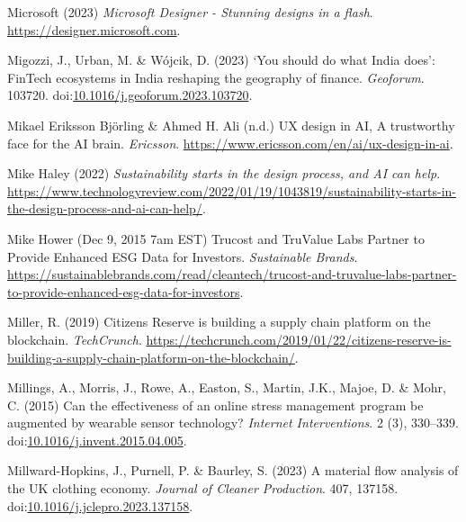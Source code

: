 \documentclass[
  letterpaper,
  DIV=11,
  numbers=noendperiod]{scrartcl}
\newlength{\cslhangindent}
\newenvironment{CSLReferences}[2] %
 {\begin{list}{}{%
  \setlength{\itemindent}{0pt}
  \setlength{\leftmargin}{0pt}
  \setlength{\parsep}{0pt}
  \ifodd #1
   \setlength{\leftmargin}{\cslhangindent}
   \setlength{\itemindent}{-1\cslhangindent}
  \fi
  \setlength{\itemsep}{#2\baselineskip}}}
 {\end{list}}
\begin{document}
\begin{CSLReferences}{0}{1}
Microsoft (2023) \emph{Microsoft {Designer} - {Stunning} designs in a
flash}. \url{https://designer.microsoft.com}.

Migozzi, J., Urban, M. \& Wójcik, D. (2023) {`{You} should do what
{India} does'}: {FinTech} ecosystems in {India} reshaping the geography
of finance. \emph{Geoforum}. 103720.
doi:\href{https://doi.org/10.1016/j.geoforum.2023.103720}{10.1016/j.geoforum.2023.103720}.

Mikael Eriksson Björling \& Ahmed H. Ali (n.d.) {UX} design in {AI}, {A}
trustworthy face for the {AI} brain. \emph{Ericsson}.
\url{https://www.ericsson.com/en/ai/ux-design-in-ai}.

Mike Haley (2022) \emph{Sustainability starts in the design process, and
{AI} can help}.
\url{https://www.technologyreview.com/2022/01/19/1043819/sustainability-starts-in-the-design-process-and-ai-can-help/}.

Mike Hower (Dec 9, 2015 7am EST) Trucost and {TruValue Labs Partner} to
{Provide Enhanced ESG Data} for {Investors}. \emph{Sustainable Brands}.
\url{https://sustainablebrands.com/read/cleantech/trucost-and-truvalue-labs-partner-to-provide-enhanced-esg-data-for-investors}.

Miller, R. (2019) Citizens {Reserve} is building a supply chain platform
on the blockchain. \emph{TechCrunch}.
\url{https://techcrunch.com/2019/01/22/citizens-reserve-is-building-a-supply-chain-platform-on-the-blockchain/}.

Millings, A., Morris, J., Rowe, A., Easton, S., Martin, J.K., Majoe, D.
\& Mohr, C. (2015) Can the effectiveness of an online stress management
program be augmented by wearable sensor technology? \emph{Internet
Interventions}. 2 (3), 330--339.
doi:\href{https://doi.org/10.1016/j.invent.2015.04.005}{10.1016/j.invent.2015.04.005}.

Millward-Hopkins, J., Purnell, P. \& Baurley, S. (2023) A material flow
analysis of the {UK} clothing economy. \emph{Journal of Cleaner
Production}. 407, 137158.
doi:\href{https://doi.org/10.1016/j.jclepro.2023.137158}{10.1016/j.jclepro.2023.137158}.


\end{CSLReferences}
\end{document}
